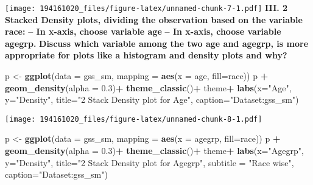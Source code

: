 \documentclass[
]{article}
\newenvironment{Shaded}{\begin{snugshade}}{\end{snugshade}}
\newcommand{\DataTypeTok}[1]{\textcolor[rgb]{0.13,0.29,0.53}{#1}}
\newcommand{\FloatTok}[1]{\textcolor[rgb]{0.00,0.00,0.81}{#1}}
\newcommand{\KeywordTok}[1]{\textcolor[rgb]{0.13,0.29,0.53}{\textbf{#1}}}
\newcommand{\NormalTok}[1]{#1}
\newcommand{\OperatorTok}[1]{\textcolor[rgb]{0.81,0.36,0.00}{\textbf{#1}}}
\newcommand{\StringTok}[1]{\textcolor[rgb]{0.31,0.60,0.02}{#1}}
\begin{document}
\texttt{[image: 194161020\_files/figure-latex/unnamed-chunk-7-1.pdf]}
\textbf{III. 2 Stacked Density plots, dividing the observation based on
the variable race:} \textbf{-- In x-axis, choose variable age}
\textbf{-- In x-axis, choose variable agegrp.} \textbf{Discuss which
variable among the two age and agegrp, is more appropriate for plots
like a histogram and density plots and why?}

\begin{Shaded}
\begin{Highlighting}[]
\NormalTok{p <-}\StringTok{ }\KeywordTok{ggplot}\NormalTok{(}\DataTypeTok{data =}\NormalTok{ gss_sm,}
            \DataTypeTok{mapping =} \KeywordTok{aes}\NormalTok{(}\DataTypeTok{x =}\NormalTok{ age, }\DataTypeTok{fill=}\NormalTok{race))}
\NormalTok{p }\OperatorTok{+}\StringTok{ }\KeywordTok{geom_density}\NormalTok{(}\DataTypeTok{alpha =} \FloatTok{0.3}\NormalTok{)}\OperatorTok{+}
\StringTok{  }\KeywordTok{theme_classic}\NormalTok{()}\OperatorTok{+}
\StringTok{  }\NormalTok{theme}\OperatorTok{+}
\StringTok{  }\KeywordTok{labs}\NormalTok{(}\DataTypeTok{x=}\StringTok{"Age"}\NormalTok{, }\DataTypeTok{y=}\StringTok{"Density"}\NormalTok{, }
       \DataTypeTok{title=}\StringTok{"2 Stack Density plot for Age"}\NormalTok{,}
       \DataTypeTok{caption=}\StringTok{"Dataset:gss_sm"}\NormalTok{)}
\end{Highlighting}
\end{Shaded}

\texttt{[image: 194161020\_files/figure-latex/unnamed-chunk-8-1.pdf]}

\begin{Shaded}
\begin{Highlighting}[]
\NormalTok{p <-}\StringTok{ }\KeywordTok{ggplot}\NormalTok{(}\DataTypeTok{data =}\NormalTok{ gss_sm,}
            \DataTypeTok{mapping =} \KeywordTok{aes}\NormalTok{(}\DataTypeTok{x =}\NormalTok{ agegrp, }\DataTypeTok{fill=}\NormalTok{race))}
\NormalTok{p }\OperatorTok{+}\StringTok{ }\KeywordTok{geom_density}\NormalTok{(}\DataTypeTok{alpha =} \FloatTok{0.3}\NormalTok{)}\OperatorTok{+}
\StringTok{  }\KeywordTok{theme_classic}\NormalTok{()}\OperatorTok{+}
\StringTok{  }\NormalTok{theme}\OperatorTok{+}
\StringTok{  }\KeywordTok{labs}\NormalTok{(}\DataTypeTok{x=}\StringTok{"Agegrp"}\NormalTok{, }\DataTypeTok{y=}\StringTok{"Density"}\NormalTok{, }
       \DataTypeTok{title=}\StringTok{"2 Stack Density plot for Agegrp"}\NormalTok{, }
       \DataTypeTok{subtitle =} \StringTok{"Race wise"}\NormalTok{, }
       \DataTypeTok{caption=}\StringTok{"Dataset:gss_sm"}\NormalTok{)}
\end{Highlighting}
\end{Shaded}
\end{document}
